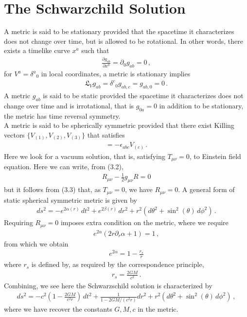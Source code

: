 \documentclass[11pt, onesided]{book}
\theoremstyle{break}
\theoremstyle{break}
\newcommand{\pd}{\partial}
\begin{document}
\section[The Schwarzchild Solution]{\color{red} The Schwarzchild Solution\color{black}}
A metric is said to be stationary provided that the spacetime it characterizes does not change over time, but is allowed to be rotational. In other words, there exists a timelike curve $x^a$ such that
\begin{align*}
\frac{\pd g_{ab}}{\pd x^0} = \pd_0 g_{ab} = 0\,,
\end{align*}
for $V^a = \delta^a{}_0$ in local coordinates, a metric is stationary implies
\begin{align*}
\mathfrak{L}_Vg_{ab} = \delta^c{}_0g_{ab,c} = g_{ab,0} = 0\,.
\end{align*}
A metric $g_{ab}$ is said to be static provided the spacetime it characterizes does not change over time and is irrotational, that is $g_{0a} = 0$ in addition to be stationary, the metric has time reversal symmetry. \\

A metric is said to be spherically symmetric provided that there exist Killing vectors $\{V_{(1)},V_{(2)}, V_{(3)}\}$ that satisfies
\begin{align*}
[V_{(a)}, V_{(b)}] = -\epsilon_{abc}V_{(c)}\,.
\end{align*}
Here we look for a vacuum solution, that is, satisfying $T_{\mu\nu} = 0$, to Einstein field equation. Here we can write, from (3.2),
\begin{align*}
R_{\mu\nu} - \frac{1}{2}g_{\mu\nu}R = 0
\end{align*}
but it follows from (3.3) that, as $T_{\mu\nu} = 0$, we have $R_{\mu\nu} = 0$. A general form of static spherical symmetric metric is given by
\begin{align*}
ds^2 = -e^{2\alpha(r)} \, dt^2 + e^{2\beta (r)}\, dr^2 + r^2 \left(d\theta^2 + \sin^2(\theta)\, d\phi^2\right)\,.
\end{align*}
Requiring $R_{\mu\nu} = 0$ imposes extra condition on the metric, where we require
\begin{align*}
e^{2\alpha}(2r\pd_r \alpha + 1) = 1\,,
\end{align*}
from which we obtain
\begin{align*}
e^{2\alpha} = 1- \frac{r_s}{r}
\end{align*}
where $r_s$ is defined by, as required by the correspondence principle,
\begin{align*}
r_s = \frac{2GM}{c^2}\,.
\end{align*}
Combining, we see here the Schwarzschild solution is characterized by
\begin{align}
ds^2 = -c^2\left( 1- \frac{2GM}{c^2 r}\right)\, dt^2 + \frac{1}{1 - 2GM/(c^2r)}dr^2 + r^2 \left(d\theta^2 + \sin^2(\theta)\, d\phi^2\right)\,,
\end{align} 
where we have recover the constants $G,M,c$ in the metric. 
\newpage
\end{document}

